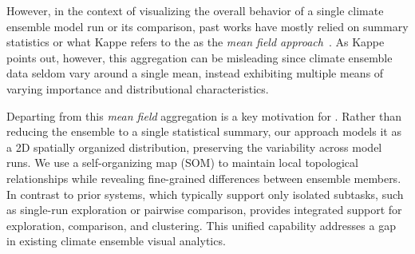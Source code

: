 

However, in the context of visualizing the overall behavior of a single climate ensemble model run or its comparison, past works have mostly relied on summary statistics or what Kappe refers to the as the \textit{mean field approach}~\cite{kappe2022visual}.
%
As Kappe points out, however, this aggregation can be misleading since climate ensemble data seldom vary around a single mean, instead exhibiting multiple means of varying importance and distributional characteristics.

%
Departing from this \textit{mean field} aggregation is a key motivation for \ClimateSOM. Rather than reducing the ensemble to a single statistical summary, our approach models it as a 2D spatially organized distribution, preserving the variability across model runs. We use a self-organizing map (SOM) to maintain local topological relationships while revealing fine-grained differences between ensemble members. In contrast to prior systems, which typically support only isolated subtasks, such as single-run exploration or pairwise comparison, \ClimateSOM provides integrated support for exploration, comparison, and clustering. This unified capability addresses a gap in existing climate ensemble visual analytics.


